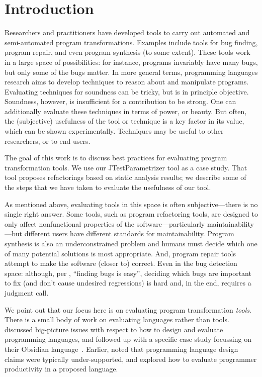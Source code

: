 \section{Introduction}
Researchers and practitioners have developed tools to carry out
automated and semi-automated program transformations.  Examples
include tools for bug finding, program repair, and even 
program synthesis (to some extent). These tools work in a large space of possibilities:
for instance, programs invariably have many bugs, but only some of the bugs
matter.
In more general terms, programming languages research aims to develop
techniques to reason about and manipulate programs. Evaluating
techniques for soundness can be tricky, but is in principle
objective. Soundness, however, is insufficient for a contribution to
be strong. One can additionally evaluate these techniques in terms of
power, or beauty. But often, the (subjective) usefulness of the tool or technique
is a key factor in its value, which can be shown
experimentally. Techniques may be useful to other researchers, or to
end users.

The goal of this work is to discuss best practices for evaluating
program transformation tools. We use our
JTestParametrizer tool as a case study. That tool proposes
refactorings based on static analysis results; we describe some of the
steps that we have taken to evaluate the usefulness of our tool.

As mentioned above, evaluating tools in this space is often subjective---there is no
single right answer. Some tools, such as program refactoring tools,
are designed to only affect nonfunctional properties of the
software---particularly maintainability---but different users have
different standards for maintainability. Program synthesis is also an
underconstrained problem and humans must decide which one of many
potential solutions is most appropriate. And, program repair
tools attempt to make the software (closer to) correct. Even in 
the bug detection space: although, per 
, ``finding bugs is
easy'', deciding which bugs are
important to fix (and don't cause undesired regressions) is hard and,
in the end, requires a judgment call. 

We point out that our focus here is on evaluating program transformation \emph{tools}.
There is a small body of work on evaluating languages rather than tools.
discussed big-picture issues with respect to how to design and evaluate programming languages, and followed up with a specific case study focussing on their Obsidian
language~\cite{coblenz20:_can_advan_type_system_be_usabl}.
Earlier,  noted that programming 
language design claims were typically under-supported, and  explored how to evaluate programmer productivity in a
proposed language. 

